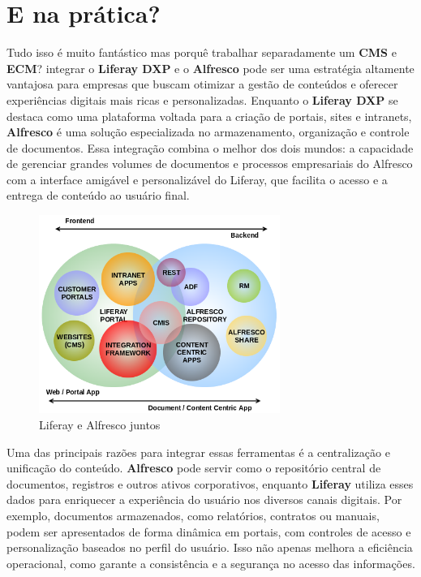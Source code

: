 \documentclass[a4paper,11pt]{article}
\begin{document}
\section{E na prática?}
Tudo isso é muito fantástico mas porquê trabalhar separadamente um \textbf{CMS} e \textbf{ECM}? integrar o \textbf{Liferay DXP} e o \textbf{Alfresco} pode ser uma estratégia altamente vantajosa para empresas que buscam otimizar a gestão de conteúdos e oferecer experiências digitais mais ricas e personalizadas. Enquanto o \textbf{Liferay DXP} se destaca como uma plataforma voltada para a criação de portais, sites e intranets, \textbf{Alfresco} é uma solução especializada no armazenamento, organização e controle de documentos. Essa integração combina o melhor dos dois mundos: a capacidade de gerenciar grandes volumes de documentos e processos empresariais do Alfresco com a interface amigável e personalizável do Liferay, que facilita o acesso e a entrega de conteúdo ao usuário final.
\begin{figure}[!htb]
	\centering
	\includegraphics[width=0.7\textwidth]{imagens/AlfeLif}
	\caption{Liferay e Alfresco juntos}
\end{figure}

Uma das principais razões para integrar essas ferramentas é a centralização e unificação do conteúdo. \textbf{Alfresco} pode servir como o repositório central de documentos, registros e outros ativos corporativos, enquanto \textbf{Liferay} utiliza esses dados para enriquecer a experiência do usuário nos diversos canais digitais. Por exemplo, documentos armazenados, como relatórios, contratos ou manuais, podem ser apresentados de forma dinâmica em portais, com controles de acesso e personalização baseados no perfil do usuário. Isso não apenas melhora a eficiência operacional, como garante a consistência e a segurança no acesso das informações.
\end{document}
